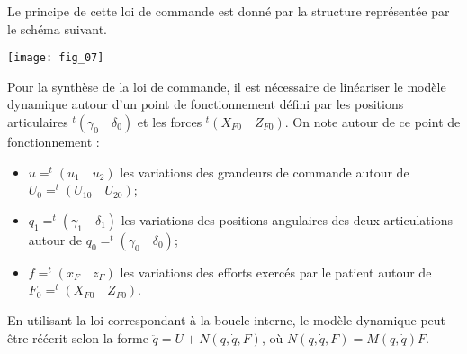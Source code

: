 \begin{multicols}{2}
Le principe de cette loi de commande est donné par la structure représentée par le schéma suivant.

\begin{center}
\texttt{[image: fig\_07]}
\end{center}


Pour la synthèse de la loi de commande, il est nécessaire de linéariser le modèle dynamique autour d’un point
de fonctionnement défini par les positions articulaires $ ^t(\gamma_0 \quad \delta_0)$ et les forces $ ^t\left(X_{F0}\quad Z_{F0}\right)$. On note autour de ce point de fonctionnement :
\begin{itemize}
\item $ u = ^t\left(u_1\quad u_2\right)$ les variations des grandeurs de commande autour de $ U_0 = ^t\left(U_{10}\quad U_{20}\right)$;
\item $q_1 = ^t\left(\gamma_1 \quad \delta_1\right)$ les variations des positions angulaires des deux articulations autour de $q_0 = ^t\left(\gamma_0 \quad \delta_0\right)$;
\item $ f = ^t\left(x_F \quad z_F \right)$ les variations des efforts exercés par le patient autour de $F_0 =  ^t\left(X_{F0} \quad Z_{F0} \right)$.
\end{itemize}
En utilisant la loi correspondant à la boucle interne, le modèle dynamique peut-être réécrit selon la forme
$\ddot{q}= U + N\left(q, \dot{q}, F\right)$, où $N\left(q, \dot{q}, F\right) = M\left(q, \dot{q}\right) F$.



\ifprof
\begin{corrige}
\end{corrige}
\else
\fi



\ifprof
\begin{corrige}
\end{corrige}
\else
\fi



\end{multicols}

